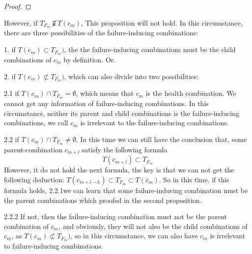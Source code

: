 \documentclass{sig-alternate}
\begin{document}
\begin{proof}

\end{proof}

However, if $T_{F_{m}} \not\subsetneqq T(c_{m})$, This proposition will not hold. In this circumstance, there are three possibilities of the failure-inducing combinations:

1. if $T(c_{m}) \subset T_{F_{m}})$, the the failure-inducing combinations must be the child combinations of $c_{m}$ by definition. Or.

2. if $T(c_{m}) \not\subset T_{F_{m}})$, which can also divide into two possibilities:

  2.1 if $T(c_{m}) \cap T_{F_{m}} = \emptyset$, which means that $c_{m}$ is the health combination. We cannot get any information of failure-inducing combinations. In this circumstance, neither its parent and child combinations is the failure-inducing combinations,  we call $c_{m}$ is irrelevant to the failure-inducing combinations.

  2.2 if $T(c_{m}) \cap T_{F_{m}} \neq \emptyset$. In this time we can still have the conclusion that, some parent-combination $c_{m+l}$ satisfy the following formula
 \begin{displaymath}
  T(c_{m+l}) \subset T_{F_{m}}
\end{displaymath}
However, it do not hold the next formula, the key is that we can not get the following deduction:
 $T(c_{m+l-h}) \subset T_{F_{m}} \subset T(c_{m})$. So in this time, if this formula holds, 2.2.1we can learn that some failure-inducing combination must be the parent combinations which proofed in the second proposition.

 2.2.2 If not, then the failure-inducing combination must not be the parent combination of $c_{m}$, and obviously, they will not also be the child combinations of $c_{m}$, as  $T(c_{m}) \not\subset T_{F_{m}})$, so in this circumstance, we can also have $c_{m}$ is irrelevant to failure-inducing combinations.
\end{document}
